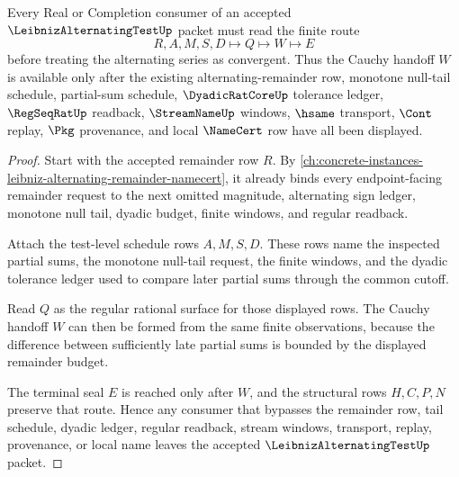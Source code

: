 \begin{theorem}
\label{thm:leibniz-alternating-test-cauchy-handoff}
Every Real or Completion consumer of an accepted $\LeibnizAlternatingTestUp$ packet must read the finite route
$$
R,A,M,S,D \longmapsto Q \longmapsto W \longmapsto E
$$
before treating the alternating series as convergent. Thus the Cauchy handoff $W$ is available only after the existing alternating-remainder row, monotone null-tail schedule, partial-sum schedule, $\DyadicRatCoreUp$ tolerance ledger, $\RegSeqRatUp$ readback, $\StreamNameUp$ windows, $\hsame$ transport, $\Cont$ replay, $\Pkg$ provenance, and local $\NameCert$ row have all been displayed.
\end{theorem}
\begin{proof}
Start with the accepted remainder row $R$. By \autoref{ch:concrete-instances-leibniz-alternating-remainder-namecert}, it already binds every endpoint-facing remainder request to the next omitted magnitude, alternating sign ledger, monotone null tail, dyadic budget, finite windows, and regular readback.

Attach the test-level schedule rows $A,M,S,D$. These rows name the inspected partial sums, the monotone null-tail request, the finite windows, and the dyadic tolerance ledger used to compare later partial sums through the common cutoff.

Read $Q$ as the regular rational surface for those displayed rows. The Cauchy handoff $W$ can then be formed from the same finite observations, because the difference between sufficiently late partial sums is bounded by the displayed remainder budget.

The terminal seal $E$ is reached only after $W$, and the structural rows $H,C,P,N$ preserve that route. Hence any consumer that bypasses the remainder row, tail schedule, dyadic ledger, regular readback, stream windows, transport, replay, provenance, or local name leaves the accepted $\LeibnizAlternatingTestUp$ packet.
\end{proof}



